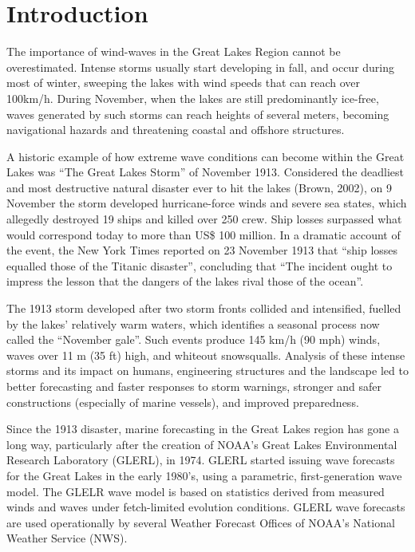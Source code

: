 \section{Introduction}

The importance of wind-waves in the Great Lakes Region cannot be overestimated.
Intense storms usually start developing in fall, and occur during
most of winter, sweeping the lakes with wind speeds that can reach over
100km/h. During November, when the lakes are still predominantly ice-free,
waves generated by such storms can reach heights of several meters,
becoming navigational hazards and threatening coastal and offshore
structures.

A historic example of how extreme wave conditions can become within
the Great Lakes was ``The Great Lakes Storm''
of November 1913. Considered the deadliest and most destructive natural
disaster ever to hit the lakes (Brown, 2002), on 9 November the storm
developed hurricane-force winds and severe sea states, which allegedly destroyed
19 ships and
killed over 250 crew. Ship losses surpassed what would correspond
today to more than US\$ 100 million. In a dramatic account of the
event, the New York Times reported on 23 November 1913 that ``ship
losses equalled those of the Titanic disaster'', concluding
that ``The incident ought to impress the lesson that
the dangers of the lakes rival those of the ocean''.

The 1913 storm developed after two storm fronts collided and intensified,
fuelled by the lakes' relatively warm waters, which identifies a seasonal
process
now called the ``November gale''. Such events produce
145 km/h (90 mph) winds, waves over 11 m (35 ft) high, and whiteout
snowsqualls. Analysis of these intense storms and its impact on humans,
engineering
structures and the landscape led to better forecasting and faster
responses to storm warnings, stronger and safer constructions (especially
of marine vessels), and improved preparedness.

Since the 1913 disaster, marine forecasting in the Great Lakes region has gone
a long way, particularly after the creation of NOAA's Great Lakes
Environmental Research Laboratory (GLERL), in 1974. GLERL started issuing wave
forecasts for the Great Lakes in the early 1980's, using a parametric,
first-generation wave model. The GLELR wave model is based on statistics
derived from measured winds and waves under fetch-limited evolution conditions.
GLERL wave forecasts are used operationally by several Weather Forecast
Offices of NOAA's National Weather Service (NWS).

